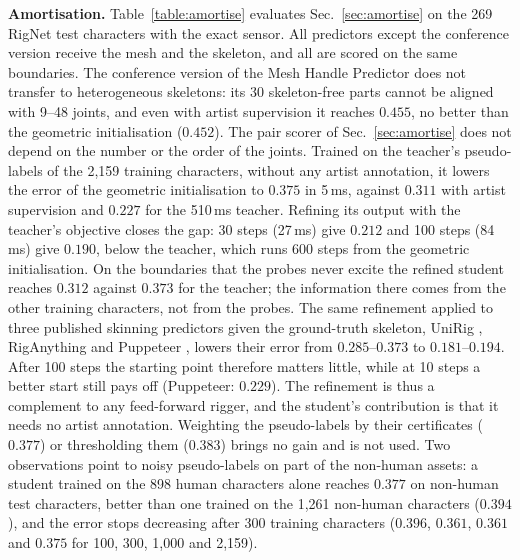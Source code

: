 \documentclass[lettersize,journal]{IEEEtran}
\newenvironment{revblock}{\par\color{red}}{\par}
\begin{document}
\begin{revblock}
\textbf{Amortisation.} Table~\ref{table:amortise} evaluates Sec.~\ref{sec:amortise} on the 269
RigNet test characters \cite{xu2020rignet} with the exact sensor. All predictors except the
conference version receive the mesh and the skeleton, and all are scored on the same boundaries.
The conference version of the Mesh
Handle Predictor does not transfer to heterogeneous skeletons: its 30 skeleton-free parts cannot
be aligned with 9--48 joints, and even with artist supervision it reaches $0.455$, no better than
the geometric initialisation ($0.452$). The pair scorer of Sec.~\ref{sec:amortise} does not
depend on the number or the order of the joints. Trained on the teacher's pseudo-labels of the
2,159 training characters, without any artist annotation, it lowers the error of the geometric
initialisation to $0.375$ in 5\,ms, against $0.311$ with artist supervision and $0.227$ for the
510\,ms teacher. Refining its output with the teacher's objective closes the gap: 30 steps
(27\,ms) give $0.212$ and 100 steps (84\,ms) give $0.190$, below the teacher, which runs 600
steps from the geometric initialisation. On the boundaries that the probes never excite the
refined student reaches $0.312$ against $0.373$ for the teacher; the information there comes
from the other training characters, not from the probes. The same refinement applied to three
published skinning predictors given the ground-truth skeleton, UniRig \cite{zhang2025unirig},
RigAnything \cite{liu2025riganything} and Puppeteer \cite{song2026puppeteer}, lowers their
error from $0.285$--$0.373$ to $0.181$--$0.194$. After 100 steps the starting point therefore
matters little, while at 10 steps a better start still pays off (Puppeteer: $0.229$). The
refinement is thus a complement to any feed-forward rigger, and the student's contribution is
that it needs no artist annotation. Weighting the pseudo-labels by their certificates ($0.377$)
or thresholding them ($0.383$) brings no gain and is not used. Two observations point to noisy
pseudo-labels on part of the non-human assets: a student trained on the 898 human characters
alone reaches $0.377$ on non-human test characters, better than one trained on the 1,261
non-human characters ($0.394$), and the error stops decreasing after 300 training characters
($0.396$, $0.361$, $0.361$ and $0.375$ for 100, 300, 1,000 and 2,159).
\end{revblock}
\end{document}

